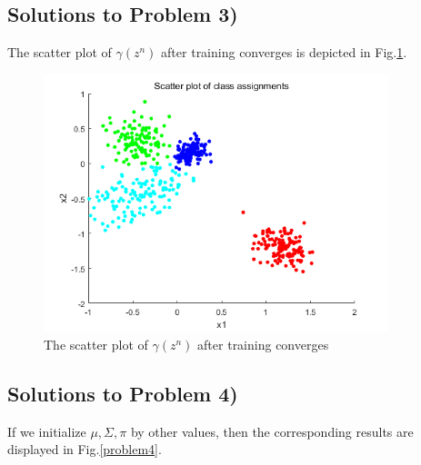 \documentclass{article}
\begin{document}
\begin{spacing}{1.5}
\subsection{Solutions to Problem 3)}
The scatter plot of $\gamma(z^{n})$ after training converges is depicted in Fig.\ref{1-2}.
\begin{figure}
  \centering
  \includegraphics[width=10cm]{1-2}
  \caption{The scatter plot of $\gamma(z^{n})$ after training converges}\label{1-2} 
\end{figure}

\subsection{Solutions to Problem 4)}
If we initialize $\mu, \Sigma, \pi$ by other values, then the corresponding results are displayed in Fig.\ref{problem4}.


\end{spacing}
\end{document}
